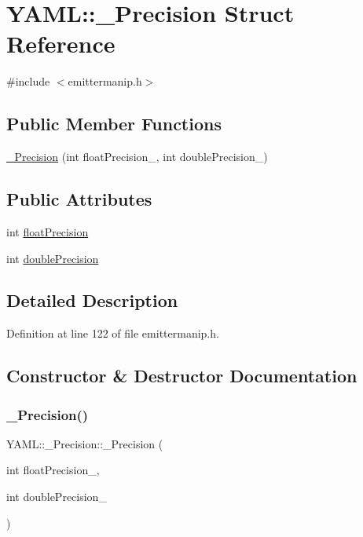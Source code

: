 \hypertarget{struct_y_a_m_l_1_1___precision}{}\section{Y\+A\+ML\+::\+\_\+\+Precision Struct Reference}
\label{struct_y_a_m_l_1_1___precision}


{\ttfamily \#include $<$emittermanip.\+h$>$}

\subsection*{Public Member Functions}
\begin{DoxyCompactItemize}
\item 
\mbox{\hyperlink{struct_y_a_m_l_1_1___precision_a06fdc1bd29b0faba17f26aa048885191}{\+\_\+\+Precision}} (int float\+Precision\+\_\+, int double\+Precision\+\_\+)
\end{DoxyCompactItemize}
\subsection*{Public Attributes}
\begin{DoxyCompactItemize}
\item 
int \mbox{\hyperlink{struct_y_a_m_l_1_1___precision_a0d7c7c0d93e93d16bf0ace70ecc3fa2a}{float\+Precision}}
\item 
int \mbox{\hyperlink{struct_y_a_m_l_1_1___precision_a83839ae6543a9a771b17bca886b97b69}{double\+Precision}}
\end{DoxyCompactItemize}


\subsection{Detailed Description}


Definition at line 122 of file emittermanip.\+h.



\subsection{Constructor \& Destructor Documentation}
\mbox{\label{struct_y_a_m_l_1_1___precision_a06fdc1bd29b0faba17f26aa048885191}} 
\subsubsection{\texorpdfstring{\_Precision()}{\_Precision()}}
{\footnotesize\ttfamily Y\+A\+M\+L\+::\+\_\+\+Precision\+::\+\_\+\+Precision (\begin{DoxyParamCaption}\item[{int}]{float\+Precision\+\_\+,  }\item[{int}]{double\+Precision\+\_\+ }\end{DoxyParamCaption})\hspace{0.3cm}{\ttfamily [inline]}}



